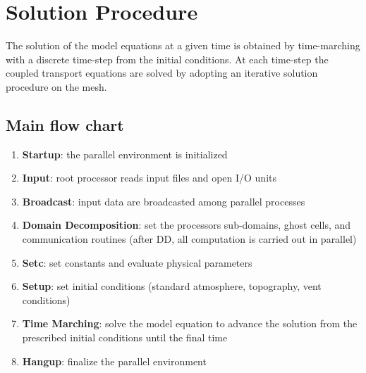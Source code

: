 \section{\label{sect:solproc} Solution Procedure}
%
The solution of the model equations at a given time is obtained by time-marching
with a discrete time-step from the initial conditions. At each time-step the
coupled transport equations are solved by adopting an iterative solution 
procedure on the mesh.

\subsection{Main flow chart}

\begin{enumerate}
\item {\bf Startup}: the parallel environment is initialized
\item {\bf Input}: root processor reads input files and open I/O units
\item {\bf Broadcast}: input data are broadcasted among parallel processes
\item {\bf Domain Decomposition}: set the processors sub-domains, ghost cells, and communication routines
(after DD, all computation is carried out in parallel)
\item {\bf Setc}: set constants and evaluate physical parameters
\item {\bf Setup}: set initial conditions (standard atmosphere, topography, vent conditions)
\item {\bf Time Marching}: solve the model equation to advance the solution 
from the prescribed initial conditions until the final time
\item {\bf Hangup}: finalize the parallel environment
\end{enumerate}

